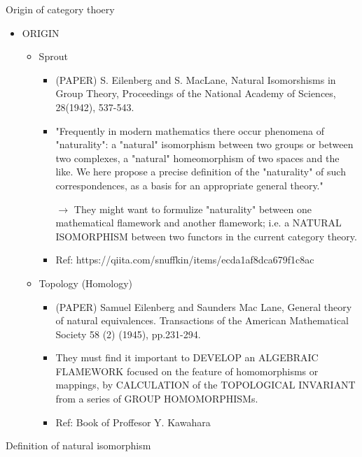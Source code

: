 \documentclass[dvipdfmx,10pt,notheorems]{beamer}
\renewcommand{\#}{^\sharp}
\begin{document}
	\begin{frame}{Origin of category thoery}
		\begin{itemize}
			\item ORIGIN
				\begin{itemize}
					\item Sprout
						\begin{itemize}
							\item (PAPER) S. Eilenberg and S. MacLane, Natural Isomorshisms in
							Group Theory, Proceedings of the National Academy of Sciences,
							28(1942), 537-543.
							\item "Frequently in modern mathematics there occur phenomena of "naturality":
			a "natural" isomorphism between two groups or between
			two complexes, a "natural" homeomorphism of two spaces and the
			like. We here propose a precise definition of the "naturality" of such
			correspondences, as a basis for an appropriate general theory."
							\item[$\rightarrow$] They might want to formulize "naturality" between one mathematical
			flamework and another flamework; i.e. a NATURAL ISOMORPHISM
			between two functors in the current category theory.
							\item Ref: https://qiita.com/snuffkin/items/ecda1af8dca679f1c8ac
						\end{itemize}
					\item Topology (Homology)
						\begin{itemize}
							\item (PAPER) Samuel Eilenberg and Saunders Mac Lane, General theory
							of natural equivalences. Transactions of the American Mathematical
							Society 58 (2) (1945), pp.231-294.
							\item They must find it important to DEVELOP an ALGEBRAIC
							FLAMEWORK focused on the feature of homomorphisms or
							mappings, by CALCULATION of the TOPOLOGICAL INVARIANT
							from a series of GROUP HOMOMORPHISMs.
							\item Ref: Book of Proffesor Y. Kawahara
						\end{itemize}
				\end{itemize}
		\end{itemize}
	\end{frame}






	\begin{frame}{Definition of natural isomorphism}

	\end{frame}
\end{document}
